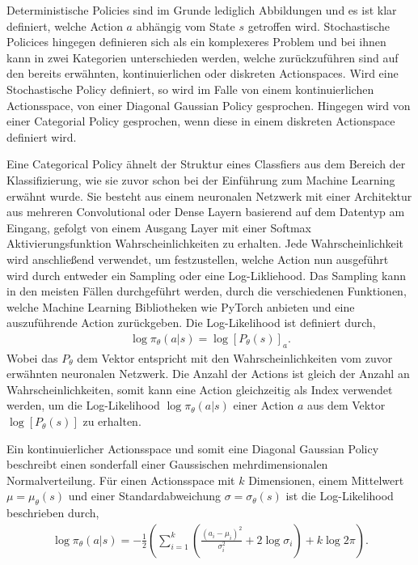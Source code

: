 \documentclass[]{iat}
\begin{document}
Deterministische Policies sind im Grunde lediglich Abbildungen und es ist klar definiert, welche Action $a$ abhängig vom State $s$ getroffen wird. Stochastische Policices hingegen definieren sich als ein komplexeres Problem und bei ihnen kann in zwei Kategorien unterschieden werden, welche zurückzuführen sind auf den bereits erwähnten, kontinuierlichen oder diskreten Actionspaces. Wird eine Stochastische Policy definiert, so wird im Falle von einem kontinuierlichen Actionsspace, von einer Diagonal Gaussian Policy gesprochen. Hingegen wird von einer Categorial Policy gesprochen, wenn diese in einem diskreten Actionspace definiert wird.

Eine Categorical Policy ähnelt der Struktur eines Classfiers aus dem Bereich der Klassifizierung, wie sie zuvor schon bei der Einführung zum Machine Learning erwähnt wurde. Sie besteht aus einem neuronalen Netzwerk mit einer Architektur aus mehreren Convolutional oder Dense Layern basierend auf dem Datentyp am Eingang, gefolgt von einem Ausgang Layer mit einer Softmax Aktivierungsfunktion Wahrscheinlichkeiten zu erhalten. Jede Wahrscheinlichkeit wird anschließend verwendet, um festzustellen, welche Action nun ausgeführt wird durch entweder ein Sampling oder eine Log-Likliehood. Das Sampling kann in den meisten Fällen durchgeführt werden, durch die verschiedenen Funktionen, welche Machine Learning Bibliotheken wie PyTorch \cite[]{pytorch} anbieten und eine auszuführende Action zurückgeben. Die Log-Likelihood ist definiert durch,
\begin{align}
    \log \pi_\theta (a|s) = \log\left[P_\theta(s)\right]_a.
\end{align}
Wobei das $P_\theta$ dem Vektor entspricht mit den Wahrscheinlichkeiten vom zuvor erwähnten neuronalen Netzwerk. Die Anzahl der Actions ist gleich der Anzahl an Wahrscheinlichkeiten, somit kann eine Action gleichzeitig als Index verwendet werden, um die Log-Likelihood $\log \pi_\theta (a|s)$ einer Action $a$ aus dem Vektor $\log\left[P_\theta(s)\right]$ zu erhalten.

Ein kontinuierlicher Actionsspace und somit eine Diagonal Gaussian Policy beschreibt einen sonderfall einer Gaussischen mehrdimensionalen Normalverteilung. Für einen Actionsspace mit $k$ Dimensionen, einem Mittelwert $\mu = \mu_{\theta}(s)$ und einer Standardabweichung $\sigma = \sigma_{\theta}(s)$ ist die Log-Likelihood beschrieben durch,
\begin{align}
    \log \pi_\theta (a|s) = -\frac{1}{2} \left(\sum_{i = 1}^{k} \left( \frac{(a_i-\mu_i)^2}{\sigma_i^2}+2 \log \sigma_i\right) + k \log 2 \pi \right). \label{eq:dg_log_loglikelihood}
\end{align}
\cite[]{SpinningUp2018}
\end{document}
